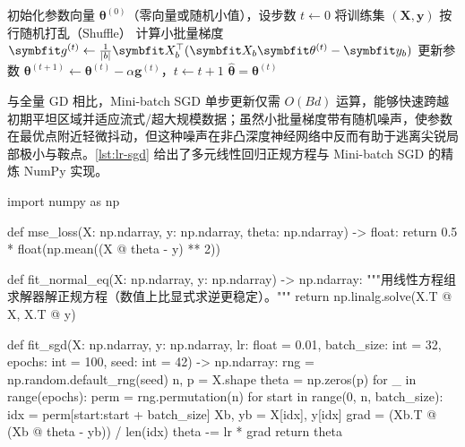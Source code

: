\begin{algorithm}\label{alg:minibatch-sgd}
\begin{algsteps}
  \State 初始化参数向量 $\bm{\theta}^{(0)}$（零向量或随机小值），设步数 $t \gets 0$
    \State 将训练集 $(\bm{X}, \bm{y})$ 按行随机打乱（Shuffle）
      \State 计算小批量梯度 $\bm{g}^{(t)} \gets \frac{1}{\abs{b}}\bm{X}_b^\top(\bm{X}_b\bm{\theta}^{(t)} - \bm{y}_b)$
      \State 更新参数 $\bm{\theta}^{(t+1)} \gets \bm{\theta}^{(t)} - \alpha \bm{g}^{(t)}$，$t \gets t + 1$
    \EndFor
  \EndFor
  \State \Return $\hat{\bm{\theta}} = \bm{\theta}^{(t)}$
\end{algsteps}
\end{algorithm}

与全量 GD 相比，Mini-batch SGD 单步更新仅需 $O(Bd)$ 运算，能够快速跨越初期平坦区域并适应流式/超大规模数据；虽然小批量梯度带有随机噪声，使参数在最优点附近轻微抖动，但这种噪声在非凸深度神经网络中反而有助于逃离尖锐局部极小与鞍点。\cref{lst:lr-sgd} 给出了多元线性回归正规方程与 Mini-batch SGD 的精炼 NumPy 实现。

\begin{codeblock}[language=Python,caption={多元线性回归的解析解与小批量随机梯度下降实现},label=lst:lr-sgd]
import numpy as np

def mse_loss(X: np.ndarray, y: np.ndarray, theta: np.ndarray) -> float:
    return 0.5 * float(np.mean((X @ theta - y) ** 2))

def fit_normal_eq(X: np.ndarray, y: np.ndarray) -> np.ndarray:
    """用线性方程组求解器解正规方程（数值上比显式求逆更稳定）。"""
    return np.linalg.solve(X.T @ X, X.T @ y)

def fit_sgd(X: np.ndarray, y: np.ndarray, lr: float = 0.01,
            batch_size: int = 32, epochs: int = 100, seed: int = 42) -> np.ndarray:
    rng = np.random.default_rng(seed)
    n, p = X.shape
    theta = np.zeros(p)
    for _ in range(epochs):
        perm = rng.permutation(n)
        for start in range(0, n, batch_size):
            idx = perm[start:start + batch_size]
            Xb, yb = X[idx], y[idx]
            grad = (Xb.T @ (Xb @ theta - yb)) / len(idx)
            theta -= lr * grad
    return theta
\end{codeblock}


